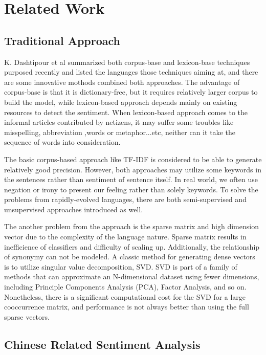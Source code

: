 \chapter{Related Work}


\section{Traditional Approach}

K. Dashtipour et al\cite{Dashtipour2016} summarized both corpus-base and lexicon-base techniques purposed recently and listed the languages those techniques aiming at, and there are some innovative mothods combined both approaches. 
The advantage of corpus-base is that it is dictionary-free, but it requires relatively larger corpus to build the model, while lexicon-based approach depends mainly on existing resources to detect the sentiment.
When lexicon-based approach comes to the informal articles contributed by netizens, it may suffer some troubles like misspelling, abbreviation ,words or metaphor...etc, neither can it take the sequence of words into consideration.   

The basic corpus-based approach like TF-IDF is considered to be able to generate relatively good precision.
However, both approaches may utilize some keywords in the sentences rather than sentiment of sentence itself. In real world, we often use negation or irony to present our feeling rather than solely keywords.
To solve the problems from rapidly-evolved languages, there are both semi-supervised and unsupervised approaches introduced as well. 

The another problem from the approach is the sparse matrix and high dimension vector due to the complexity of the language nature. 
Sparse matrix results in inefficience of classifiers and difficulty of scaling up. Additionally, the relationship of synonymy can not be modeled.
A classic method for generating dense vectors is to utilize singular value decomposition, SVD.
SVD is part of a family of methods that can approximate an N-dimensional dataset using fewer dimensions, including Principle Components Analysis (PCA), Factor Analysis, and so on.
Nonetheless, there is a significant computational cost for the SVD for a large cooccurrence matrix, and performance is not always better than using the full sparse vectors.

\section{Chinese Related Sentiment Analysis}

